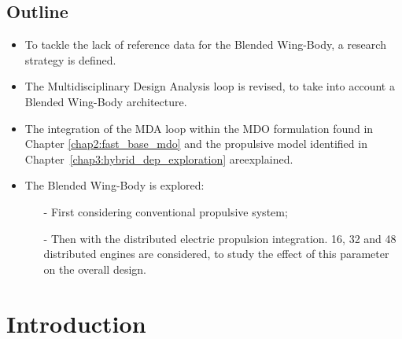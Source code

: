 \begin{mdframed}[hidealllines=true,backgroundcolor=purple!20]
	\section*{Outline}
	
	\begin{itemize}
		
		\item To tackle the lack of reference data for the Blended Wing-Body, a research strategy is defined. 
		
		\item The Multidisciplinary Design Analysis loop is revised, to take into account a Blended Wing-Body architecture. 
		
		\item The integration of the MDA loop within the MDO formulation found in Chapter \ref{chap2:fast_base_mdo} and the propulsive model identified in Chapter~\ref{chap3:hybrid_dep_exploration} areexplained. 
		
		\item The Blended Wing-Body is explored:
			\begin{itemize}
				\item[-] First considering conventional propulsive system;
				
				\item[-] Then with the distributed electric propulsion integration.
				16, 32 and 48 distributed engines are considered, to study the effect of this parameter on the overall design. 
			\end{itemize}
		
	\end{itemize}
	
\end{mdframed}

\cleardoublepage

\section{Introduction}
\label{sec:chap4_intro}

